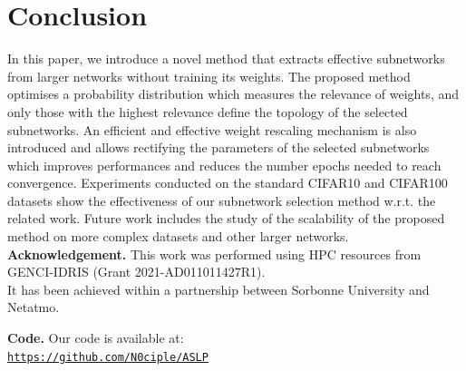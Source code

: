 \section{Conclusion}

In this paper, we introduce a novel method that extracts effective subnetworks
from larger networks without training its weights. The proposed method optimises
a probability distribution which measures the relevance of weights, and only
those with the highest relevance define the topology of the selected
subnetworks. An efficient and effective weight rescaling mechanism is also
introduced and allows rectifying the parameters of the selected subnetworks
which improves performances and reduces the number epochs needed to reach
convergence. Experiments conducted on the standard CIFAR10 and  CIFAR100
datasets show the effectiveness of our subnetwork selection method w.r.t. the
related work. Future work includes the study of the scalability of the proposed
method on more complex datasets and other larger networks.\\

\noindent\textbf{Acknowledgement.} 
This work was performed using HPC resources from GENCI-IDRIS (Grant 2021-AD011011427R1). \\
It has been achieved within a partnership between Sorbonne University and Netatmo.

\noindent\textbf{Code.} Our code is available at:\\ \href{https://github.com/N0ciple/ASLP}{\texttt{https://github.com/N0ciple/ASLP}}